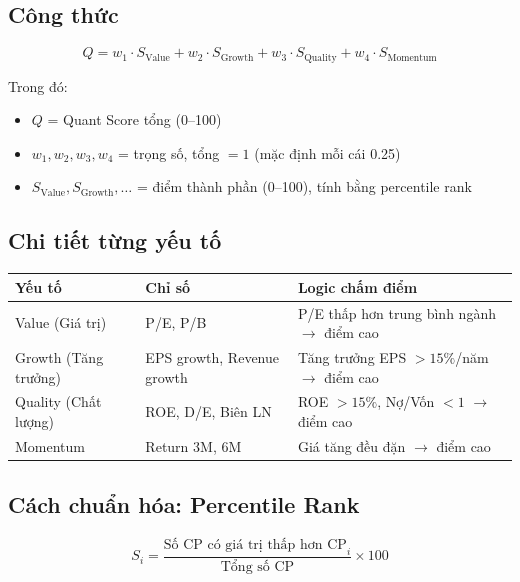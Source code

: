 \documentclass[12pt,a4paper]{article}
\begin{document}
\subsection{Công thức}

\begin{infobox}
\begin{equation}
\boxed{
  Q = w_1 \cdot S_{\text{Value}} + w_2 \cdot S_{\text{Growth}} + w_3 \cdot S_{\text{Quality}} + w_4 \cdot S_{\text{Momentum}}
}
\end{equation}

Trong đó:
\begin{itemize}[nosep]
  \item $Q$ = Quant Score tổng (0--100)
  \item $w_1, w_2, w_3, w_4$ = trọng số, tổng $= 1$ (mặc định mỗi cái 0.25)
  \item $S_{\text{Value}}, S_{\text{Growth}}, \ldots$ = điểm thành phần (0--100), tính bằng percentile rank
\end{itemize}
\end{infobox}

\subsection{Chi tiết từng yếu tố}

\begin{tabularx}{\textwidth}{l l X}
\toprule
\textbf{Yếu tố} & \textbf{Chỉ số} & \textbf{Logic chấm điểm} \\
\midrule
Value (Giá trị) & P/E, P/B & P/E thấp hơn trung bình ngành $\rightarrow$ điểm cao \\
Growth (Tăng trưởng) & EPS growth, Revenue growth & Tăng trưởng EPS $> 15\%$/năm $\rightarrow$ điểm cao \\
Quality (Chất lượng) & ROE, D/E, Biên LN & ROE $> 15\%$, Nợ/Vốn $< 1$ $\rightarrow$ điểm cao \\
Momentum & Return 3M, 6M & Giá tăng đều đặn $\rightarrow$ điểm cao \\
\bottomrule
\end{tabularx}

\subsection{Cách chuẩn hóa: Percentile Rank}

\begin{equation}
S_i = \frac{\text{Số CP có giá trị thấp hơn CP}_i}{\text{Tổng số CP}} \times 100
\end{equation}
\end{document}
